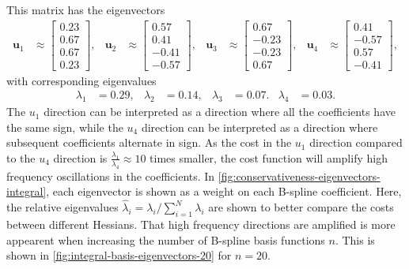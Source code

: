 This matrix has the eigenvectors 
\begin{equation}
    \begin{aligned}
        \mathbf u_1 &\approx \begin{bmatrix}  
            0.23 \\  0.67 \\  0.67 \\  0.23 
        \end{bmatrix}, &
        \mathbf u_2 &\approx \begin{bmatrix}         
            0.57 \\  0.41 \\ -0.41 \\  -0.57 
        \end{bmatrix}, &
        \mathbf u_3 &\approx \begin{bmatrix}         
            0.67 \\  -0.23 \\  -0.23 \\  0.67 
        \end{bmatrix}, &
        \mathbf u_4 &\approx \begin{bmatrix}         
            0.41 \\  -0.57 \\  0.57 \\  -0.41 
        \end{bmatrix},
    \end{aligned}
\end{equation}
with corresponding eigenvalues
\begin{equation}
    \begin{aligned}
        \lambda_1 &= 0.29, &
        \lambda_2 &= 0.14, &
        \lambda_3 &= 0.07. &
        \lambda_4 &= 0.03.
    \end{aligned}
\end{equation}
The $u_1$ direction can be interpreted as a direction where all the coefficients have the same sign, while the $u_4$ direction can be interpreted as a direction where subsequent coefficients alternate in sign. 
As the cost in the $u_1$ direction compared to the $u_4$ direction is $\frac{\lambda_1}{\lambda_4} \approx 10$ times smaller, the cost function will amplify high frequency oscillations in the coefficients. In \cref{fig:conservativeness-eigenvectors-integral}, each eigenvector is shown as a weight on each B-spline coefficient. Here, the relative eigenvalues $\hat\lambda_i = \lambda_i/\sum_{i=1}^{N} \lambda_i$ are shown to better compare the costs between different Hessians. That high frequency directions are amplified is more appearent when increasing the number of B-spline basis functions $n$. This is shown in \cref{fig:integral-basis-eigenvectors-20} for $n=20$.


